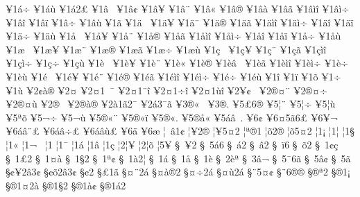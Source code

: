 {^^a51^^e1^^f7
^^a51^^e1^^f9
^^a51^^e12^^a3
^^a51^^e2^^a0
^^a51^^e2^^a2
^^a51^^e2^^a5
^^a51^^e2^^a8
^^a51^^e2^^ab
^^a51^^e2^^ae
^^a51^^e2^^e0
^^a51^^e2^^e3
^^a51^^e2^^ec^^ee
^^a51^^e2^^ec^^f7
^^a51^^e2^^ee
^^a51^^e2^^ef
^^a51^^e2^^f7
^^a51^^e2^^f9
^^a51^^e3
^^a51^^e4^^a0
^^a51^^e4^^a5
^^a51^^e4^^a8
^^a51^^e4^^ae
^^a51^^e4^^e3
^^a51^^e4^^ec^^ee
^^a51^^e4^^ec^^f7
^^a51^^e4^^ee
^^a51^^e4^^ef
^^a51^^e4^^f7
^^a51^^e4^^f9
^^a51^^e5^^a0
^^a51^^e5^^a5
^^a51^^e5^^a8
^^a51^^e5^^ae
^^a51^^e5^^e3
^^a51^^e5^^ec^^ee
^^a51^^e5^^ec^^f7
^^a51^^e5^^ee
^^a51^^e5^^ef
^^a51^^e5^^f7
^^a51^^e5^^f9
^^a51^^e6^^a0
^^a51^^e6^^a5
^^a51^^e6^^a8
^^a51^^e6^^ae
^^a51^^e6^^e3
^^a51^^e6^^f7
^^a51^^e6^^f9
^^a51^^e7^^a0
^^a51^^e7^^a5
^^a51^^e7^^a8
^^a51^^e7^^e3
^^a51^^e7^^ec^^ee
^^a51^^e7^^ec^^f7
^^a51^^e7^^f7
^^a51^^e7^^f9
^^a51^^e8^^a0
^^a51^^e8^^a5
^^a51^^e8^^a8
^^a51^^e8^^ab
^^a51^^e8^^ae
^^a51^^e8^^e2^^a0
^^a51^^e8^^e3
^^a51^^e8^^ec^^ee
^^a51^^e8^^ec^^f7
^^a51^^e8^^f7
^^a51^^e8^^f9
^^a51^^e9^^a0
^^a51^^e9^^a5
^^a51^^e9^^a8
^^a51^^e9^^ae
^^a51^^e9^^e3
^^a51^^e9^^ec^^ee
^^a51^^e9^^ec^^f7
^^a51^^e9^^f7
^^a51^^e9^^f9
^^a51^^ee
^^a51^^ef
^^a51^^f5
^^a51^^f7
^^a51^^f9
^^a52^^a2^^e0^^ae
^^a52^^a4
^^a52^^a41^^a0^^af
^^a52^^a41^^a8^^ee
^^a52^^a41^^f7^^ee
^^a52^^a41^^f9^^ee
^^a52^^a5^^a2^^a0
^^a52^^ae^^a4^^a8
^^a52^^ae^^a4^^f7
^^a52^^ae^^a4^^f9
^^a52^^ae^^ad^^a0
^^a52^^ae^^e0^^ae
^^a52^^e01^^e32^^af
^^a52^^e13^^af^^e3
^^a53^^ae^^ab^^a0
^^a53^^ae^^ad.
^^a55^^a36^^ad^^ae
^^a55^^a6^^a8
^^a55^^a6^^f7
^^a55^^a6^^f9
^^a55^^aa^^f5
^^a55^^ac^^f7
^^a55^^ac^^f9
^^a55^^ae^^ab^^a8
^^a55^^ae^^ab^^ef
^^a55^^ae^^ab.
^^a55^^ae^^e5^^ab
^^a55^^e1^^e2^^a0.
^^a56^^a2
^^a56^^a45^^e36^^a3
^^a56^^a5^^ac^^a0
^^a56^^e1^^e2^^a8^^a3
^^a56^^e1^^e2^^f7^^a3
^^a56^^e1^^e2^^f9^^a3
^^a56^^e4
^^a56^^e6
^^a6^^a0^^e21^^a2
^^a6^^a52^^ae
^^a6^^a55^^a42
^^a6^^aa^^ae1
^^a6^^f52^^ae
^^a6^^f55^^a42
^^a61^^a1
^^a61^^a6
^^a61^^a7
^^a61^^ab
^^a61^^ac^^a0
^^a61^^ad
^^a61^^af
^^a61^^e1
^^a61^^e2
^^a61^^e7
^^a62^^a6^^a5
^^a62^^a6^^f5
^^a65^^a5
^^a7^^a0^^a52
^^a7^^a0^^ad5^^e16
^^a7^^a0^^e12^^ad
^^a7^^a0^^e22
^^a7^^a0^^ef6
^^a7^^a0^^f52
^^a7^^a01^^a2^^e7
^^a7^^a01^^a32
^^a7^^a01^^a4^^e0
^^a7^^a01^^a72
^^a7^^a01^^aa^^a2
^^a7^^a01^^e02^^a6
^^a7^^a01^^e1
^^a7^^a01^^e5
^^a7^^a01^^e8
^^a7^^a02^^e8^^aa
^^a7^^a03^^e2^^ac
^^a7^^a05^^af6^^ad^^e3
^^a7^^a05^^e2^^a2
^^a7^^a05^^e3
^^a7^^a2^^a52^^e23^^a2
^^a7^^a2^^f52^^e23^^a2
^^a7^^a22
^^a7^^a31^^ad^^e3
^^a7^^a4^^a82^^e1
^^a7^^a4^^e0^^ae2
^^a7^^a4^^f72^^e1
^^a7^^a4^^f92^^e1
^^a7^^a85^^a4^^a2
^^a7^^a86^^ae^^ad^^ae
^^a7^^ae^^aa2
^^a7^^ae1^^a1
^^a7^^ae1^^a42^^e0
^^a7^^ae1^^a72
^^a7^^ae1^^e0^^a2
^^a7^^ae1^^e12
}

